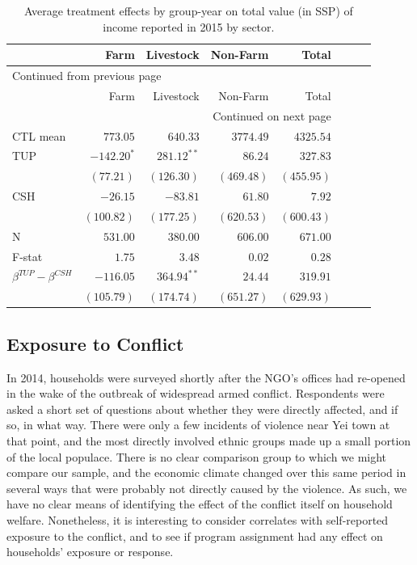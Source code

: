\documentclass[12pt,article]{article}
\begin{document}
\begin{longtable}{lrrrrrrr}
\caption{\label{tab:orgtable7}
Average treatment effects by group-year on total value (in SSP) of income reported in 2015 by sector.}
\\
\hline
 & Farm & Livestock & Non-Farm & Total\\
\hline
\endfirsthead
\multicolumn{5}{l}{Continued from previous page} \\
\hline

 & Farm & Livestock & Non-Farm & Total \\

\hline
\endhead
\hline\multicolumn{5}{r}{Continued on next page} \\
\endfoot
\endlastfoot
\hline
CTL mean & \(773.05\) & \(640.33\) & \(3774.49\) & \(4325.54\)\\
\hline
TUP & \(-142.20^{*}\) & \(281.12^{**}\) & \(86.24\) & \(327.83\)\\
 & \((77.21)\) & \((126.30)\) & \((469.48)\) & \((455.95)\)\\
CSH & \(-26.15\) & \(-83.81\) & \(61.80\) & \(7.92\)\\
 & \((100.82)\) & \((177.25)\) & \((620.53)\) & \((600.43)\)\\
\hline
N & \(531.00\) & \(380.00\) & \(606.00\) & \(671.00\)\\
F-stat & \(1.75\) & \(3.48\) & \(0.02\) & \(0.28\)\\
\hline
\(\beta^{TUP}-\beta^{CSH}\) & \(-116.05\) & \(364.94^{**}\) & \(24.44\) & \(319.91\)\\
 & \((105.79)\) & \((174.74)\) & \((651.27)\) & \((629.93)\)\\
\hline
\end{longtable}

\subsection{Exposure to Conflict}
\label{sec:orgheadline15}

In 2014, households were surveyed shortly after the NGO's offices had re-opened in
the wake of the outbreak of widespread armed conflict. Respondents were asked a short
set of questions about whether they were directly affected, and if so, in what way.
There were only a few incidents of violence near Yei town at that point, and the most
directly involved ethnic groups made up a small portion of the local populace. There
is no clear comparison group to which we might compare our sample, and the economic
climate changed over this same period in several ways that were probably not directly
caused by the violence. As such, we have no clear means of identifying the effect of
the conflict itself on household welfare. Nonetheless, it is interesting to consider
correlates with self-reported exposure to the conflict, and to see if program
assignment had any effect on households' exposure or response.
\end{document}
